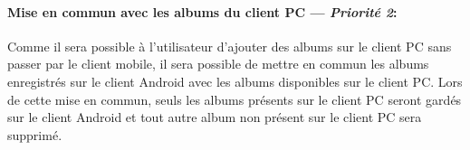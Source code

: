 \paragraph{Mise en commun avec les albums du client PC ---  \textit{Priorité 2}:} 
Comme il sera possible à l'utilisateur d'ajouter des albums sur le client PC sans passer par le client mobile, il sera possible de mettre en commun les albums enregistrés sur le client Android avec les albums disponibles sur le client PC.
Lors de cette mise en commun, seuls les albums présents sur le client PC seront gardés sur le client Android et tout autre album non présent sur le client PC sera supprimé.  

